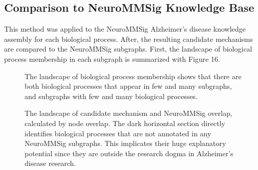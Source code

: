 \subsection{Comparison to NeuroMMSig Knowledge Base}

This method was applied to the NeuroMMSig Alzheimer's disease knowledge assembly for each biological process. After, the resulting candidate mechanisms are compared to the NeuroMMSig subgraphs. First, the landscape of biological process membership in each subgraph is summarized with Figure 16. 

\begin{figure}
\captionsetup{format=plain}
\caption[The Landscape of Biological Process Membership in NeuroMMSig Subgraphs]{The landscape of biological process membership shows that there are both biological processes that appear in few and many subgraphs, and subgraphs with few and many biological processes.}
\label{Fig:sg_comparison}
\end{figure}

\begin{figure}
\captionsetup{format=plain}
\caption[Summary of the Overlap of Candidate Mechanisms with NeuroMMSig Subgraphs]{The landscape of candidate mechanism and \ac{NeuroMMSig} overlap, calculated by node overlap. The dark horizontal section directly identifies biological processes that are not annotated in any \ac{NeuroMMSig} subgraphs. This implicates their huge explanatory potential since they are outside the research dogma in Alzheimer's disease research.}
\label{Fig:neurommsig_overlaps}
\end{figure}


